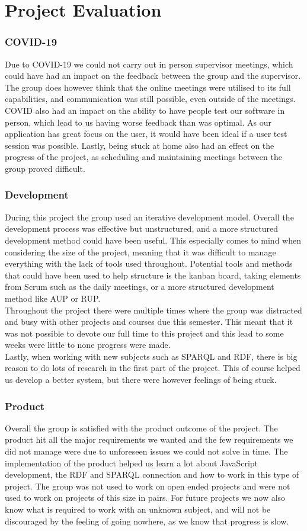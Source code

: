 \chapter{Project Evaluation}
\label{chap:project-evaluation}

\subsection{COVID-19}
Due to COVID-19 we could not carry out in person supervisor meetings, which could have had an impact on the feedback between the group and the supervisor. The group does however think that the online meetings were utilised to its full capabilities, and communication was still possible, even outside of the meetings. COVID also had an impact on the ability to have people test our software in person, which lead to us having worse feedback than was optimal. As our application has great focus on the user, it would have been ideal if a user test session was possible. Lastly, being stuck at home also had an effect on the progress of the project, as scheduling and maintaining meetings between the group proved difficult.
\subsection{Development}
During this project the group used an iterative development model. Overall the development process was effective but unstructured, and a more structured development method could have been useful. This especially comes to mind when considering the size of the project, meaning that it was difficult to manage everything with the lack of tools used throughout. Potential tools and methods that could have been used to help structure is the kanban board, taking elements from Scrum such as the daily meetings, or a more structured development method like AUP or RUP.\\
Throughout the project there were multiple times where the group was distracted and busy with other projects and courses due this semester. This meant that it was not possible to devote our full time to this project and this lead to some weeks were little to none progress were made.\\
Lastly, when working with new subjects such as SPARQL and RDF, there is big reason to do lots of research in the first part of the project. This of course helped us develop a better system, but there were however feelings of being stuck.
\subsection{Product}
Overall the group is satisfied with the product outcome of the project. The product hit all the major requirements we wanted and the few requirements we did not manage were due to unforeseen issues we could not solve in time. The implementation of the product helped us learn a lot about JavaScript development, the RDF and SPARQL connection and how to work in this type of project. The group was not used to work on open ended projects and were not used to work on projects of this size in pairs. For future projects we now also know what is required to work with an unknown subject, and will not be discouraged by the feeling of going nowhere, as we know that progress is slow.